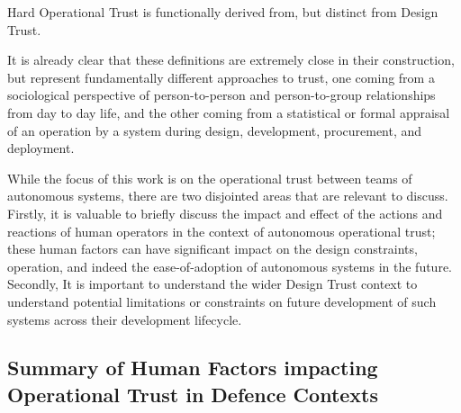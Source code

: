 Hard Operational Trust is functionally derived from, but distinct from Design Trust.

It is already clear that these definitions are extremely close in their construction, but represent fundamentally different approaches to trust, one coming from a sociological perspective of person-to-person and person-to-group relationships from day to day life, and the other coming from a statistical or formal appraisal of an operation by a system during design, development, procurement, and deployment.

While the focus of this work is on the operational trust between teams of autonomous systems, there are two disjointed areas that are relevant to discuss.
Firstly, it is valuable to briefly discuss the impact and effect of the actions and reactions of human operators in the context of autonomous operational trust; these human factors can have significant impact on the design constraints, operation, and indeed the ease-of-adoption of autonomous systems in the future. 
Secondly, It is important to understand the wider Design Trust context to understand potential limitations or constraints on future development of such systems across their development lifecycle.

\subsection{Summary of Human Factors impacting Operational Trust in Defence Contexts}

